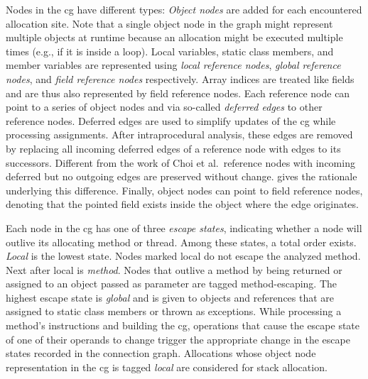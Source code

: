 			Nodes in the \gls{cg} have different types: \emph{Object nodes} are added for each encountered allocation site.
			Note that a single object node in the graph might represent multiple objects at runtime because an allocation
			might be executed multiple times (e.g., if it is inside a loop). Local variables, static class members, and member
			variables are represented using \emph{local reference nodes}, \emph{global reference nodes}, and \emph{field
			reference nodes} respectively. Array indices are treated like fields and are thus also represented by field
			reference nodes. Each reference node can point to a series of object nodes and via so-called \emph{deferred edges}
			to other reference nodes. Deferred edges are used to simplify updates of the \gls{cg} while processing
			assignments. After intraprocedural analysis, these edges are removed by replacing all incoming deferred edges of
			a reference node with edges to its successors. Different from the work of Choi et al.\ reference nodes with
			incoming deferred but no outgoing edges are preserved without change.  gives the
			rationale underlying this difference. Finally, object nodes can point to field reference nodes, denoting that the
			pointed field exists inside the object where the edge originates.

			Each node in the \gls{cg} has one of three \emph{escape states}, indicating whether a node will outlive its
			allocating method or thread. Among these states, a total order exists. \emph{Local} is the lowest state. Nodes
			marked local do not escape the analyzed method. Next after local is \emph{method}. Nodes that outlive a method by
			being returned or assigned to an object passed as parameter are tagged method-escaping. The highest escape state
			is \emph{global} and is given to objects and references that are assigned to static class members or thrown as
			exceptions. While processing a method's instructions and building the \gls{cg}, operations that cause the escape
			state of one of their operands to change trigger the appropriate change in the escape states recorded in the
			connection graph. Allocations whose object node representation in the \gls{cg} is tagged \emph{local} are
			considered for stack allocation.


